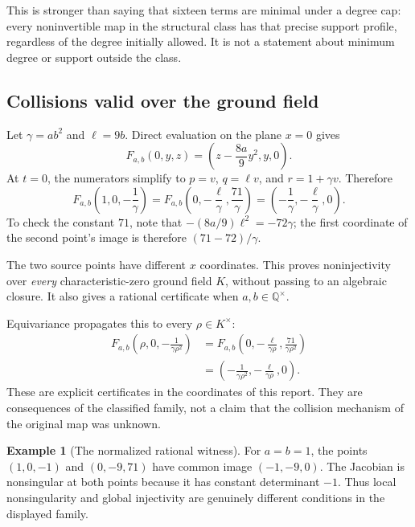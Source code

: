\documentclass[11pt,a4paper]{article}
\numberwithin{equation}{section}
\theoremstyle{definition}
\newtheorem{example}[theorem]{Example}
\theoremstyle{remark}
\newcommand{\Q}{\mathbb{Q}}
\begin{document}
This is stronger than saying that sixteen terms are minimal under a degree
cap: every noninvertible map in the structural class has that precise
support profile, regardless of the degree initially allowed. It is not a
statement about minimum degree or support outside the class.

\subsection{Collisions valid over the ground field}

Let $\gamma=ab^2$ and $\ell=9b$. Direct evaluation on the plane $x=0$
gives
\begin{equation}\label{eq:xzero}
F_{a,b}(0,y,z)=\left(z-\frac{8a}{9}y^2,y,0\right).
\end{equation}
At $t=0$, the numerators simplify to $p=v$, $q=\ell v$, and
$r=1+\gamma v$. Therefore
\begin{equation}\label{eq:newcollision}
F_{a,b}\left(1,0,-\frac1\gamma\right)
=F_{a,b}\left(0,-\frac\ell\gamma,\frac{71}\gamma\right)
=\left(-\frac1\gamma,-\frac\ell\gamma,0\right).
\end{equation}
To check the constant $71$, note that
$-(8a/9)\ell^2=-72\gamma$; the first coordinate of the second point's
image is therefore $(71-72)/\gamma$.

The two source points have different $x$ coordinates. This proves
noninjectivity over \emph{every} characteristic-zero ground field $K$,
without passing to an algebraic closure. It also gives a rational
certificate when $a,b\in\Q^\times$.

Equivariance propagates this to every $\rho\in K^\times$:
\begin{equation}\label{eq:collisionfamily}
\begin{aligned}
F_{a,b}\left(\rho,0,-\frac1{\gamma\rho^2}\right)
&=F_{a,b}\left(0,-\frac\ell{\gamma\rho},
                         \frac{71}{\gamma\rho^2}\right)\\
&=\left(-\frac1{\gamma\rho^2},-\frac\ell{\gamma\rho},0\right).
\end{aligned}
\end{equation}
These are explicit certificates in the coordinates of this report. They
are consequences of the classified family, not a claim that the collision
mechanism of the original map was unknown.

\begin{example}[The normalized rational witness]
For $a=b=1$, the points $(1,0,-1)$ and $(0,-9,71)$ have common image
$(-1,-9,0)$. The Jacobian is nonsingular at both points because it has
constant determinant $-1$. Thus local nonsingularity and global injectivity
are genuinely different conditions in the displayed family.
\end{example}
\end{document}
